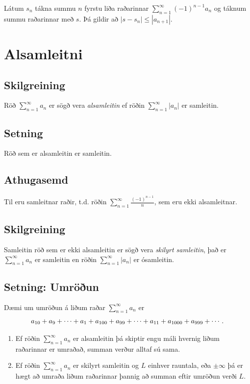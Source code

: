 \documentclass[b5paper,10pt,icelandic]{sphinxmanual}
\begin{document}
Látum \(s_n\) tákna summu \(n\) fyrstu liða raðarinnar
\(\sum_{n=1}^\infty (-1)^{n-1}a_n\) og táknum summu raðarinnar með
\(s\). Þá gildir að \(|s-s_n|\leq |a_{n+1}|\).


\section{Alsamleitni}
\label{kafli09:alsamleitni}\label{kafli09:index-10}

\subsection{Skilgreining}
\label{kafli09:id12}
Röð \(\sum_{n=1}^\infty a_n\) er sögð vera \emph{alsamleitin} ef röðin
\(\sum_{n=1}^\infty |a_n|\) er samleitin.


\subsection{Setning}
\label{kafli09:id13}
Röð sem er alsamleitin er samleitin.


\subsection{Athugasemd}
\label{kafli09:id14}
Til eru samleitnar raðir, t.d. röðin
\(\sum_{n=1}^\infty \frac{(-1)^{n-1}}{n}\), sem eru ekki
alsamleitnar.


\subsection{Skilgreining}
\label{kafli09:id15}\label{kafli09:index-11}
Samleitin röð sem er ekki alsamleitin er sögð vera
\emph{skilyrt samleitin}, það er \(\sum_{n=1}^\infty a_n\) er samleitin
en röðin \(\sum_{n=1}^\infty |a_n|\) er ósamleitin.


\subsection{Setning: Umröðun}
\label{kafli09:setning-umroun}
Dæmi um umröðun á liðum raðar \(\sum_{n=1}^\infty a_n\) er
\begin{gather}
\begin{split}a_{10}+a_9+\cdots+a_1+a_{100}+a_{99}+\cdots+a_{11}+
a_{1000}+a_{999}+\cdots.\end{split}\notag
\end{gather}\begin{enumerate}
\item {} 
Ef röðin \(\sum_{n=1}^\infty a_n\) er alsamleitin þá skiptir
engu máli hvernig liðum raðarinnar er umraðað, summan verður alltaf
sú sama.

\item {} 
Ef röðin \(\sum_{n=1}^\infty a_n\) er skilyrt samleitin og
\(L\) einhver rauntala, eða \(\pm\infty\) þá er hægt að
umraða liðum raðarinnar þannig að summan eftir umröðun verði
\(L\).

\end{enumerate}
\end{document}
